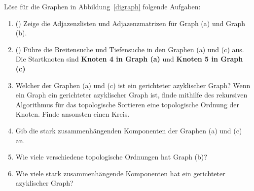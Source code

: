 \documentclass{uebung_cs}
\begin{document}
\begin{aufgabe}
	Löse für die Graphen in Abbildung~\ref{digraph} folgende Aufgaben:
	\begin{enumerate}
		\item (\warmup) Zeige die Adjazenzlisten und Adjazenzmatrizen für Graph (a) und Graph (b).
		\item (\warmup) Führe die Breitensuche und Tiefensuche in den Graphen (a) und (c) aus.
		Die Startknoten sind \textbf{Knoten 4 in Graph (a)} und \textbf{Knoten 5 in Graph (c)}
		\item Welcher der Graphen (a) und (c) ist ein gerichteter azyklischer Graph?
		Wenn ein Graph ein gerichteter azyklischer Graph ist, finde mithilfe des rekursiven Algorithmus für das topologische Sortieren eine topologische Ordnung der Knoten.
		Finde ansonsten einen Kreis.
		\item Gib die stark zusammenhängenden Komponenten der Graphen (a) und (c) an.
		\item Wie viele verschiedene topologische Ordnungen hat Graph (b)?
		\item Wie viele stark zusammenhängende Komponenten hat ein gerichteter azyklischer Graph?
	\end{enumerate}
\end{aufgabe}
\end{document}
